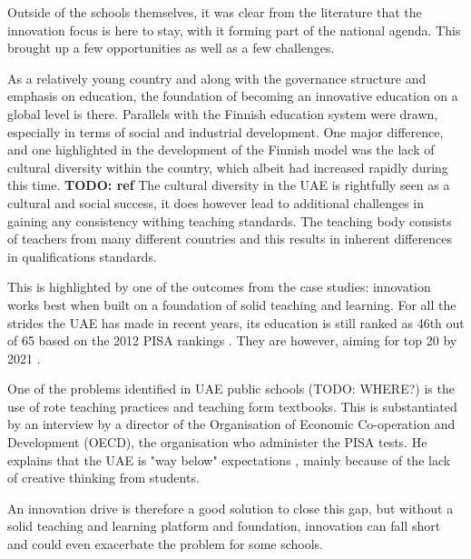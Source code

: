 Outside of the schools themselves, it was clear from the literature that the innovation focus is here to stay, with it forming part of the national agenda. This brought up a few opportunities as well as a few challenges.

As a relatively young country and along with the governance structure and emphasis on education, the foundation of becoming an innovative education on a global level is there. Parallels with the Finnish education system were drawn, especially in terms of social and industrial development. One major difference, and one highlighted in the development of the Finnish model was the lack of cultural diversity within the country, which albeit had increased rapidly during this time. \textbf{TODO: ref} The cultural diversity in the UAE is rightfully seen as a cultural and social success, it does however lead to additional challenges in gaining any consistency withing teaching standards. The teaching body consists of teachers from many different countries and this results in inherent differences in qualifications standards.

This is highlighted by one of the outcomes from the case studies: innovation works best when built on a foundation of solid teaching and learning. For all the strides the UAE has made in recent years, its education is still ranked as 46th out of 65 based on the 2012 PISA rankings \citet{2013}. They are however, aiming for top 20 by 2021 \cite{UAEGovernment2012}.

One of the problems identified in UAE public schools (TODO: WHERE?) is the use of rote teaching practices and teaching form textbooks. This is substantiated by an interview by a director of the Organisation of Economic Co-operation and Development (OECD), the organisation who administer the PISA tests. He explains that the UAE is "way below" expectations \cite{Navdar2016}, mainly because of the lack of creative thinking from students. 

An innovation drive is therefore a good solution to close this gap, but without a solid teaching and learning platform and foundation, innovation can fall short and could even exacerbate the problem for some schools.

